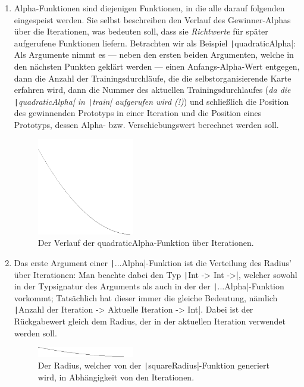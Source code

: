 \documentclass[twoside,a4paper]{article}
\newcommand{\haskell}[1]{\texttt|#1|}
\begin{document}
\begin{enumerate}
\item Alpha-Funktionen sind diejenigen Funktionen, in die alle darauf folgenden eingespeist werden. Sie selbst beschreiben den Verlauf des Gewinner-Alphas über die Iterationen, was bedeuten soll, dass sie \emph{Richtwerte} für später aufgerufene Funktionen liefern. Betrachten wir als Beispiel \haskell{quadraticAlpha}: Als Argumente nimmt es --- neben den ersten beiden Argumenten, welche in den nächsten Punkten geklärt werden --- einen Anfangs-Alpha-Wert entgegen, dann die Anzahl der Trainingsdurchläufe, die die selbstorganisierende Karte erfahren wird, dann die Nummer des aktuellen Trainingsdurchlaufes (\emph{da die \haskell{quadraticAlpha} in \haskell{train} aufgerufen wird (!)}) und schließlich die Position des gewinnenden Prototyps in einer Iteration und die Position eines Prototyps, dessen Alpha- bzw. Verschiebungswert berechnet werden soll.

\begin{figure}
\centering
\includegraphics[width=0.4\textwidth]{src/quadAlph.png}
\caption{Der Verlauf der quadraticAlpha-Funktion über Iterationen.}
\end{figure}

\item Das erste Argument einer \haskell{...Alpha}-Funktion ist die Verteilung des Radius' über Iterationen: Man beachte dabei den Typ \haskell{Int -> Int ->}, welcher sowohl in der Typsignatur des Arguments als auch in der der \haskell{...Alpha}-Funktion vorkommt; Tatsächlich hat dieser immer die gleiche Bedeutung, nämlich \haskell{Anzahl der Iteration -> Aktuelle Iteration -> Int}. Dabei ist der Rückgabewert gleich dem Radius, der in der aktuellen Iteration verwendet werden soll.

\begin{figure}
\centering
\includegraphics[width=0.4\textwidth]{src/sqRad.png}
\caption{Der Radius, welcher von der \haskell{squareRadius}-Funktion generiert wird, in Abhängigkeit von den Iterationen.}
\end{figure}


\end{enumerate}
\end{document}
